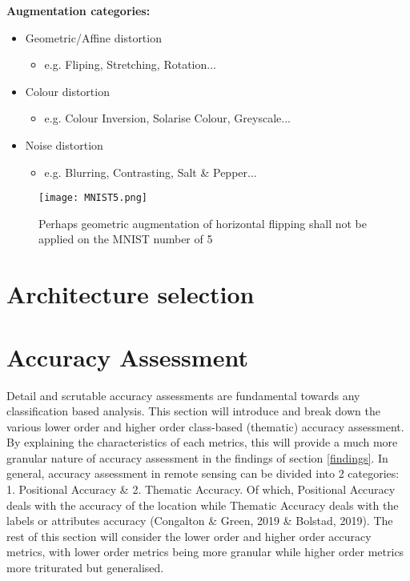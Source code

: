 \documentclass[11pt, a4paper, twoside]{report}
\begin{document}
\textbf{Augmentation categories:}

\begin{itemize}
  \item Geometric/Affine distortion
    \begin{itemize}
      \item e.g. Fliping, Stretching, Rotation...
    \end{itemize}
\end{itemize}
\begin{itemize}
  \item Colour distortion
    \begin{itemize}
      \item e.g. Colour Inversion, Solarise Colour, Greyscale...
    \end{itemize}
\end{itemize}
\begin{itemize}
  \item Noise distortion
    \begin{itemize}
      \item e.g. Blurring, Contrasting, Salt \& Pepper...
    \end{itemize}
\end{itemize}


\begin{figure}[h]
  \centering
  \texttt{[image: MNIST5.png]}
  \caption{Perhaps geometric augmentation of horizontal flipping shall not be applied on the MNIST number of 5}
  \label{fig:MNIST5}
\end{figure}


\section{Architecture selection}\label{Archi}
\section{Accuracy Assessment}\label{AccAss}

Detail and scrutable accuracy assessments are fundamental towards any classification based analysis. This section will introduce and break down the various lower order and higher order class-based (thematic) accuracy assessment. By explaining the characteristics of each metrics, this will provide a much more granular nature of accuracy assessment in the findings of section \ref{findings}. In general, accuracy assessment in remote sensing can be divided into 2 categories: 1. Positional Accuracy \& 2. Thematic Accuracy. Of which, Positional Accuracy deals with the accuracy of the location while Thematic Accuracy deals with the labels or attributes accuracy (Congalton \& Green, 2019 \& Bolstad, 2019). The rest of this section will consider the lower order and higher order accuracy metrics, with lower order metrics being more granular while higher order metrics more triturated but generalised.\\\par
\end{document}
